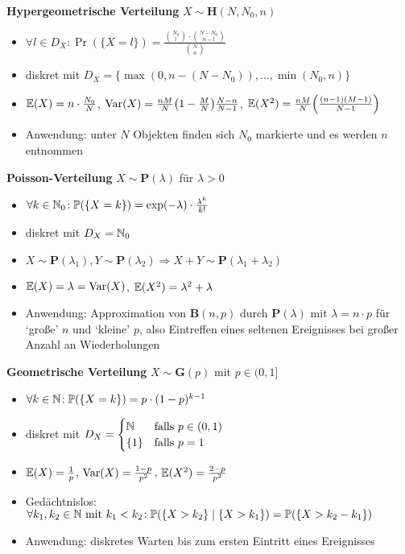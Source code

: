 \textbf{Hypergeometrische Verteilung} $X\sim\mathbf{H}(N,N_0,n)$
\begin{itemize}
\item $\forall l \in D_X\!: \Pr(\{X=l\})
  =\frac{\binom{N_0}{l} \cdot \binom{N-N_0}{n-l}}{\binom{N}{n}}$

\item diskret mit
  $D_X = \{\max(0,n-(N-N_0)),\ldots,\min(N_0,n)\}$

\item $\mathbb{E}(X) = n\cdot\frac{N_0}{N}$, $\Var(X) = \frac{nM}{N}\left(1-\frac{M}{N}\right)\frac{N-n}{N-1}$, $\E(X^2) = \frac{nM}{N}\left(\frac{(n-1)(M-1)}{N-1}\right)$

\item Anwendung: unter $N$ Objekten finden sich $N_0$ markierte und es werden
  $n$ entnommen
\end{itemize}

\textbf{Poisson-Verteilung} $X\sim\mathbf{P}(\lambda)$ für $\lambda > 0$
\begin{itemize}
\item $\forall k\in\mathbb{N}_0\!:
  \mathbb{P}(\{X=k\}) = \exp(-\lambda) \cdot \frac{\lambda^k}{k!}$

\item diskret mit $D_X = \mathbb{N}_0$

\item $X\sim\mathbf{P}(\lambda_1), Y\sim\mathbf{P}(\lambda_2)
  \Rightarrow X+Y\sim\mathbf{P}(\lambda_1 + \lambda_2)$

\item $\mathbb{E}(X) = \lambda = \operatorname{Var}(X)$, $\mathbb{E}(X^2) = \lambda^2 + \lambda$

\item Anwendung: Approximation von $\mathbf{B}(n,p)$ durch $\mathbf{P}(\lambda)$
  mit $\lambda = n \cdot p$ für `große' $n$ und `kleine' $p$, also Eintreffen
  eines seltenen Ereignisses bei großer Anzahl an Wiederholungen
\end{itemize}

\newpage
\textbf{Geometrische Verteilung} $X\sim\mathbf{G}(p)$ mit $p \in (0,1]$
\begin{itemize}
\item $\forall k\in\mathbb{N}\!: \mathbb{P}(\{X=k\}) = p \cdot (1-p)^{k-1}$

\item diskret mit $D_X = \begin{cases}
\mathbb{N}              & \text{falls } p \in (0,1)  \\
\{1\}           & \text{falls } p = 1
\end{cases}$

\item $\mathbb{E}(X) = \frac{1}{p}$, $\operatorname{Var}(X) = \frac{1-p}{p^2}$,
  $\mathbb{E}(X^2) = \frac{2-p}{p^2}$

\item Gedächtnislos:\\ $\forall k_1,k_2\in\mathbb{N} \text{ mit } k_1 < k_2\!:
  \mathbb{P}(\{X > k_2\} \mid \{X > k_1\}) = \mathbb{P}(\{X > k_2 - k_1\})$

\item Anwendung: diskretes Warten bis zum ersten Eintritt eines Ereignisses
\end{itemize}

